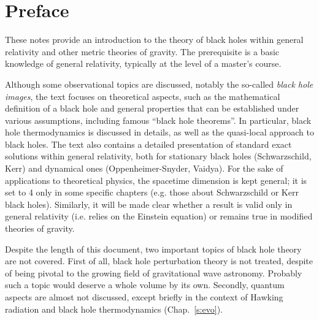 \chapter*{Preface}

These notes provide an introduction to the theory of black holes within
general relativity and other metric theories of gravity.
The prerequisite is a basic knowledge of general relativity, typically at the level of a master's
course.

Although some observational topics are discussed, notably the so-called \emph{black hole
images}, the text focuses on theoretical aspects, such as the mathematical definition of
a black hole and general properties that can be established under various assumptions,
including famous ``black hole theorems''.
In particular, black hole thermodynamics is discussed in details, as well as the quasi-local approach to black holes.
The text also contains a detailed presentation of standard exact solutions within general relativity,
both for stationary black holes (Schwarzschild, Kerr) and
dynamical ones (Oppenheimer-Snyder, Vaidya).
For the sake of applications to theoretical physics, the spacetime dimension is kept general; it
is set to 4 only in some specific chapters (e.g. those about Schwarzschild or Kerr black holes).
Similarly, it will be made clear whether a result is valid only in general relativity (i.e. relies on the Einstein equation) or remains true in modified theories of gravity.

Despite the length of this document, two important topics of black hole theory are not covered.
First of all, black hole perturbation theory is not treated, despite of being pivotal
to the growing field of gravitational wave astronomy. Probably such a topic would deserve
a whole volume by its own. Secondly,
quantum aspects are almost not discussed, except briefly in the context of Hawking radiation and black hole thermodynamics (Chap.~\ref{s:evo}).


